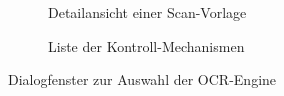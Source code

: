 \documentclass[notables, nomenclature, oneside, 150]{HSMW-Thesis}
\begin{document}
\begin{figure}[h!]
\begin{subfigure}[t]{0.3\textwidth}
        			\caption{Detailansicht einer Scan-Vorlage}
        			\label{fig:liste2}
    			\end{subfigure}
    			\begin{subfigure}[t]{0.3\textwidth}
        			\caption{Liste der Kontroll-Mechanismen}
        			\label{fig:liste3}
    			\end{subfigure}
    			\caption{Dialogfenster zur Auswahl der OCR-Engine}
				\label{fig:vorlagen}
			\end{figure}
			
\end{document}
